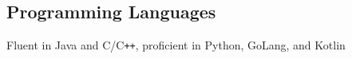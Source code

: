 \documentclass[../Resume.tex]{subfiles}
\begin{document}
	\subsection{Programming Languages}
	Fluent in Java and C/C\verb!++!, proficient in Python, GoLang, and Kotlin
	\vspace*{-4mm}
\end{document}
